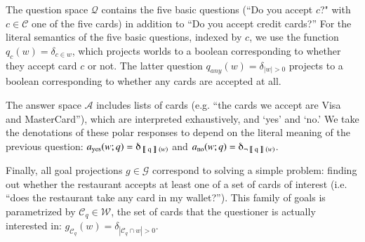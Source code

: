 \documentclass[11pt, floatsintext]{apa6}
\newcommand{\den}[2][]{
\(
\left\llbracket\;\text{#2}\;\right\rrbracket^{#1}
\)
}
\begin{document}
The question space $\mathcal{Q}$ contains the five basic questions (``Do you accept $c$?" with $c \in \mathcal{C}$ one of the five cards) in addition to ``Do you accept credit cards?'' For the literal semantics of the five basic questions, indexed by $c$, we use the function $q_c(w) = \delta_{c \in w}$, which projects worlds to a boolean corresponding to whether they accept card $c$ or not.
The latter question $q_{any}(w)  = \delta_{|w| > 0}$ projects to a boolean corresponding to whether any cards are accepted at all. %

The answer space $\mathcal{A}$ includes lists of cards (e.g. ``the cards we accept are Visa and MasterCard''), which are interpreted exhaustively, and  `yes' and `no.' We take the denotations of these polar responses to depend on the literal meaning of the previous question: $a_{\text{yes}}(w;q) = \delta_{\textrm{\den{q}}(w)}$ and $a_{\text{no}}(w;q) = \delta_{\neg \textrm{\den{q}}(w)}$.

Finally, all goal projections $g \in \mathcal{G}$ correspond to solving a simple problem: finding out whether the restaurant accepts at least one of a set of cards of interest (i.e. ``does the restaurant take any card in my wallet?''). This family of goals is parametrized by $\mathcal{C}_q \in \mathcal{W}$, the set of cards that the questioner is actually interested in: 
$g_{\mathcal{C}_q}(w) = \delta_{|\mathcal{C}_q \cap w | > 0}$.
\end{document}
